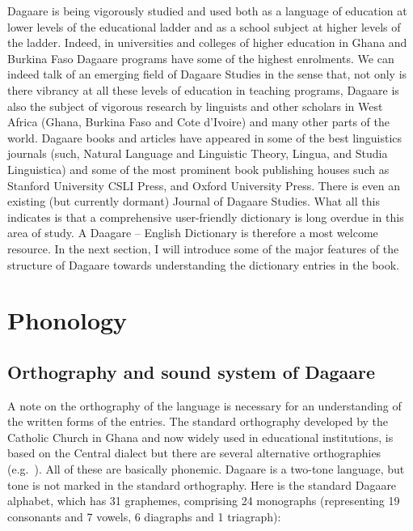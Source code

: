 \begin{refsection}
Dagaare is being vigorously studied and used both as a language of education at lower levels of the educational ladder and as a school subject at higher levels of the ladder. Indeed, in universities and colleges of higher education in Ghana and Burkina Faso Dagaare programs have some of the highest enrolments. We can indeed talk of an emerging field of Dagaare Studies in the sense that, not only is there vibrancy at all these levels of education in teaching programs, Dagaare is also the subject of vigorous research by linguists and other scholars in West Africa (Ghana, Burkina Faso and Cote d'Ivoire) and many other parts of the world. Dagaare books and articles have appeared in some of the best linguistics journals (such, Natural Language and Linguistic Theory, Lingua, and Studia Linguistica) and some of the most prominent book publishing houses such as Stanford University CSLI Press, and Oxford University Press. There is even an existing (but currently dormant) Journal of Dagaare Studies. What all this indicates is that a comprehensive user-friendly dictionary is long overdue in this area of study. A Daagare – English Dictionary is therefore a most welcome resource. In the next section, I will introduce some of the major features of the structure of Dagaare towards understanding the dictionary entries in the book.


\section{Phonology}

\subsection{Orthography and sound system of Dagaare}

A note on the orthography of the language is necessary for an understanding of the written forms of the entries. The standard orthography developed by the Catholic Church in Ghana and now widely used in educational institutions, is based on the Central dialect but there are several alternative orthographies (e.g.\  \citealt{Nakuma1999,Nakuma2002}). All of these are basically phonemic. Dagaare is a two-tone language, but tone is not marked in the standard orthography. Here is the standard Dagaare alphabet, which has 31 graphemes, comprising 24 monographs (representing 19 consonants and 7 vowels, 6 diagraphs and 1 triagraph):


\end{refsection}

